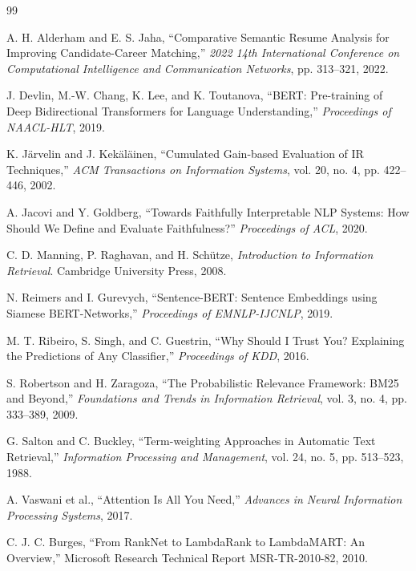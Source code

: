 \documentclass[12pt,a4paper,oneside]{report}
\begin{document}
\clearpage
\renewcommand{\bibname}{References}
\begin{thebibliography}{99}

A. H. Alderham and E. S. Jaha,
``Comparative Semantic Resume Analysis for Improving Candidate-Career Matching,''
\emph{2022 14th International Conference on Computational Intelligence and Communication Networks}, pp. 313--321, 2022.

J. Devlin, M.-W. Chang, K. Lee, and K. Toutanova,
``BERT: Pre-training of Deep Bidirectional Transformers for Language Understanding,''
\emph{Proceedings of NAACL-HLT}, 2019.

K. J\"arvelin and J. Kek\"al\"ainen,
``Cumulated Gain-based Evaluation of IR Techniques,''
\emph{ACM Transactions on Information Systems}, vol. 20, no. 4, pp. 422--446, 2002.

A. Jacovi and Y. Goldberg,
``Towards Faithfully Interpretable NLP Systems: How Should We Define and Evaluate Faithfulness?''
\emph{Proceedings of ACL}, 2020.

C. D. Manning, P. Raghavan, and H. Sch\"utze,
\emph{Introduction to Information Retrieval}.
Cambridge University Press, 2008.

N. Reimers and I. Gurevych,
``Sentence-BERT: Sentence Embeddings using Siamese BERT-Networks,''
\emph{Proceedings of EMNLP-IJCNLP}, 2019.

M. T. Ribeiro, S. Singh, and C. Guestrin,
``Why Should I Trust You? Explaining the Predictions of Any Classifier,''
\emph{Proceedings of KDD}, 2016.

S. Robertson and H. Zaragoza,
``The Probabilistic Relevance Framework: BM25 and Beyond,''
\emph{Foundations and Trends in Information Retrieval}, vol. 3, no. 4, pp. 333--389, 2009.

G. Salton and C. Buckley,
``Term-weighting Approaches in Automatic Text Retrieval,''
\emph{Information Processing and Management}, vol. 24, no. 5, pp. 513--523, 1988.

A. Vaswani et al.,
``Attention Is All You Need,''
\emph{Advances in Neural Information Processing Systems}, 2017.


C. J. C. Burges,
``From RankNet to LambdaRank to LambdaMART: An Overview,''
Microsoft Research Technical Report MSR-TR-2010-82, 2010.


\end{thebibliography}
\end{document}
